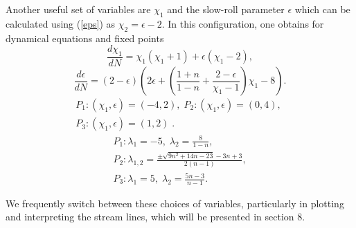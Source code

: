 \documentclass[a4paper,11pt]{article}
\begin{document}
Another useful set of variables are $\chi_1$ and the slow-roll parameter $\epsilon$ which can be calculated using (\ref{eps}) as $\chi_2=\epsilon-2$. In this configuration, one obtains for dynamical equations and fixed points
\begin{equation}
\frac{d\chi_1}{dN}=\chi_1(\chi_1+1)+\epsilon(\chi_1-2),
\end{equation}
\begin{equation}
\frac{d\epsilon}{dN}=(2-\epsilon)\left(2\epsilon+\left(\frac{1+n}{1-n}+\frac{2-\epsilon}{\chi_1-1}\right)\chi_1-8 \right).
\end{equation}
\begin{equation}
\begin{aligned}
P_1: (\chi_1,\epsilon)=(-4,2),\;
P_2: (\chi_1,\epsilon)=(0,4),\;\\
P_3: (\chi_1,\epsilon)=(1,2)\;.
\end{aligned} 
\end{equation}
\begin{equation}
\begin{aligned}
P_1: \lambda_1=-5,\; \lambda_2=\frac{8}{1-n},\\
P_2: \lambda_{1,2}=\frac{\pm\sqrt{9 n^2+14 n-23}-3 n+3}{2 (n-1)},\\
P_3: \lambda_1=5,\; \lambda_2=\frac{5n-3}{n-1}.
\end{aligned}
\end{equation}

We frequently switch between these choices of variables, particularly in plotting and interpreting the stream lines, which will be presented in section 8.
\end{document}
